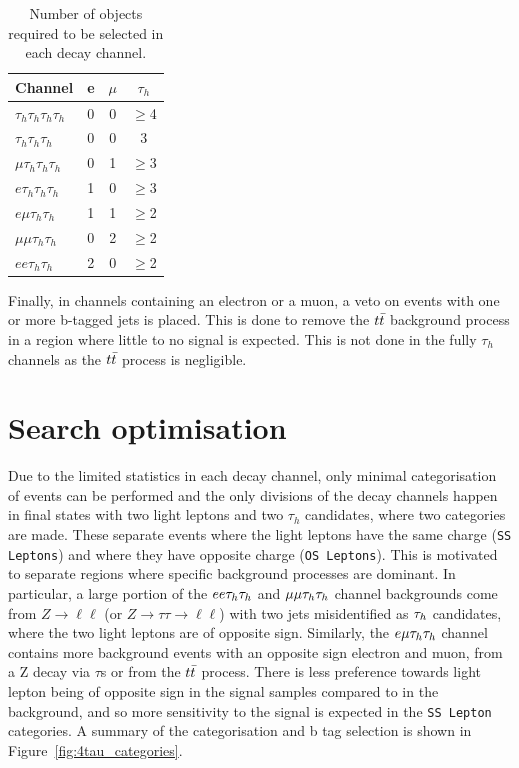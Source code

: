 \begin{table}[H]
   \centering
   \begin{tabular}{|l|c|c|c|}
   \hline
   \multicolumn{1}{|c|}{Channel} & e & $\mu$ & $\tau_h$ \\ \hline \hline
   $\tau_h \tau_h \tau_h \tau_h$ & 0 & 0     & $\geq$4        \\
   $\tau_h \tau_h \tau_h$        & 0 & 0     & 3        \\ 
   $\mu \tau_h \tau_h \tau_h$    & 0 & 1     & $\geq$3        \\
   $e \tau_h \tau_h \tau_h$      & 1 & 0     & $\geq$3        \\
   $e \mu \tau_h \tau_h$         & 1 & 1     & $\geq$2        \\
   $\mu \mu \tau_h \tau_h$       & 0 & 2     & $\geq$2        \\
   $e e \tau_h \tau_h$           & 2 & 0     & $\geq$2        \\ \hline
   \end{tabular}
   \caption{Number of objects required to be selected in each decay channel.}
   \label{tab:leptonvetoes}
\end{table}

Finally, in channels containing an electron or a muon, a veto on events with one or more b-tagged jets is placed.
This is done to remove the $t\bar{t}$ background process in a region where little to no signal is expected.
This is not done in the fully $\tau_h$ channels as the $t\bar{t}$ process is negligible. \\

\section{Search optimisation}

Due to the limited statistics in each decay channel, only minimal categorisation of events can be performed and the only divisions of the decay channels happen in final states with two light leptons and two $\tau_h$ candidates, where two categories are made.
These separate events where the light leptons have the same charge (\texttt{SS Leptons}) and where they have opposite charge (\texttt{OS Leptons}).
This is motivated to separate regions where specific background processes are dominant.
In particular, a large portion of the $ee\tau_{h}\tau_{h}$ and $\mu\mu\tau_{h}\tau_{h}$ channel backgrounds come from $Z\rightarrow \ell\ell$ (or $Z\rightarrow\tau\tau\rightarrow \ell\ell$) with two jets misidentified as $\tau_{h}$ candidates, where the two light leptons are of opposite sign.
Similarly, the $e\mu\tau_{h}\tau_{h}$ channel contains more background events with an opposite sign electron and muon, from a Z decay via $\tau$s or from the $t\bar{t}$ process.
There is less preference towards light lepton being of opposite sign in the signal samples compared to in the background, and so more sensitivity to the signal is expected in the \texttt{SS Lepton} categories. 
A summary of the categorisation and b tag selection is shown in Figure~\ref{fig:4tau_categories}. \\


